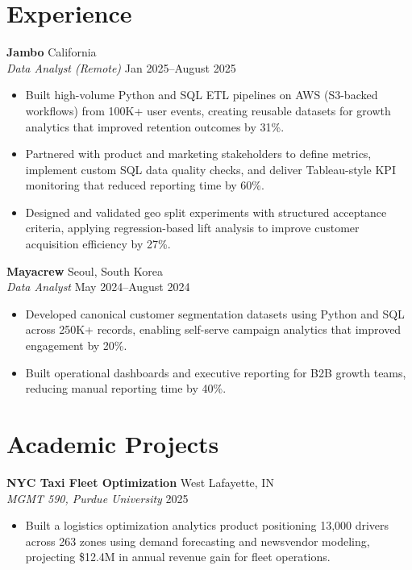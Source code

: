 \documentclass[11pt,a4paper]{article}
\begin{document}
\section*{Experience}
\noindent
\textbf{Jambo} \hfill California \\
\textit{Data Analyst (Remote)} \hfill Jan 2025--August 2025
\begin{itemize}[leftmargin=*, noitemsep, topsep=0pt]
    \item Built high-volume Python and SQL ETL pipelines on AWS (S3-backed workflows) from 100K+ user events, creating reusable datasets for growth analytics that improved retention outcomes by 31\%.
    \item Partnered with product and marketing stakeholders to define metrics, implement custom SQL data quality checks, and deliver Tableau-style KPI monitoring that reduced reporting time by 60\%.
    \item Designed and validated geo split experiments with structured acceptance criteria, applying regression-based lift analysis to improve customer acquisition efficiency by 27\%.
\end{itemize}
\vspace{6pt}

\noindent
\textbf{Mayacrew} \hfill Seoul, South Korea \\
\textit{Data Analyst} \hfill May 2024--August 2024
\begin{itemize}[leftmargin=*, noitemsep, topsep=0pt]
    \item Developed canonical customer segmentation datasets using Python and SQL across 250K+ records, enabling self-serve campaign analytics that improved engagement by 20\%.
    \item Built operational dashboards and executive reporting for B2B growth teams, reducing manual reporting time by 40\%.
\end{itemize}

\section*{Academic Projects}
\noindent
\textbf{NYC Taxi Fleet Optimization} \hfill West Lafayette, IN \\
\textit{MGMT 590, Purdue University} \hfill 2025
\begin{itemize}[leftmargin=*, noitemsep, topsep=0pt]
    \item Built a logistics optimization analytics product positioning 13,000 drivers across 263 zones using demand forecasting and newsvendor modeling, projecting \$12.4M in annual revenue gain for fleet operations.
\end{itemize}
\vspace{6pt}
\end{document}
